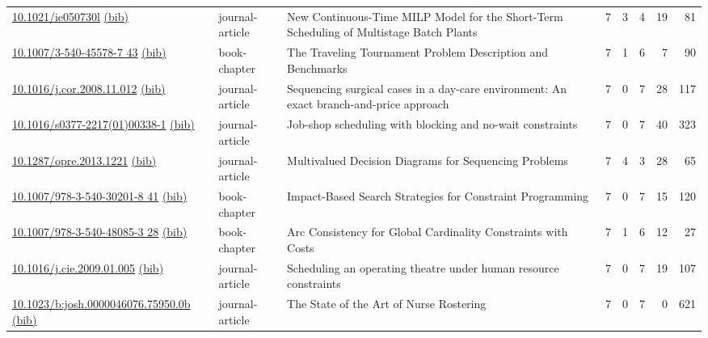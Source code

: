 {\begin{longtable}{p{5cm}lp{11cm}rrrrr}
\href{http://dx.doi.org/10.1021/ie050730l}{10.1021/ie050730l} \href{https://www.doi2bib.org/bib/10.1021/ie050730l}{(bib)} & journal-article & New Continuous-Time MILP Model for the Short-Term Scheduling of Multistage Batch Plants & 7 & 3 & 4 & 19 & 81 \\
\href{http://dx.doi.org/10.1007/3-540-45578-7_43}{10.1007/3-540-45578-7 43} \href{https://www.doi2bib.org/bib/10.1007/3-540-45578-7_43}{(bib)} & book-chapter & The Traveling Tournament Problem Description and Benchmarks & 7 & 1 & 6 & 7 & 90 \\
\href{http://dx.doi.org/10.1016/j.cor.2008.11.012}{10.1016/j.cor.2008.11.012} \href{https://www.doi2bib.org/bib/10.1016/j.cor.2008.11.012}{(bib)} & journal-article & Sequencing surgical cases in a day-care environment: An exact branch-and-price approach & 7 & 0 & 7 & 28 & 117 \\
\href{http://dx.doi.org/10.1016/s0377-2217(01)00338-1}{10.1016/s0377-2217(01)00338-1} \href{https://www.doi2bib.org/bib/10.1016/s0377-2217(01)00338-1}{(bib)} & journal-article & Job-shop scheduling with blocking and no-wait constraints & 7 & 0 & 7 & 40 & 323 \\
\href{http://dx.doi.org/10.1287/opre.2013.1221}{10.1287/opre.2013.1221} \href{https://www.doi2bib.org/bib/10.1287/opre.2013.1221}{(bib)} & journal-article & Multivalued Decision Diagrams for Sequencing Problems & 7 & 4 & 3 & 28 & 65 \\
\href{http://dx.doi.org/10.1007/978-3-540-30201-8_41}{10.1007/978-3-540-30201-8 41} \href{https://www.doi2bib.org/bib/10.1007/978-3-540-30201-8_41}{(bib)} & book-chapter & Impact-Based Search Strategies for Constraint Programming & 7 & 0 & 7 & 15 & 120 \\
\href{http://dx.doi.org/10.1007/978-3-540-48085-3_28}{10.1007/978-3-540-48085-3 28} \href{https://www.doi2bib.org/bib/10.1007/978-3-540-48085-3_28}{(bib)} & book-chapter & Arc Consistency for Global Cardinality Constraints with Costs & 7 & 1 & 6 & 12 & 27 \\
\href{http://dx.doi.org/10.1016/j.cie.2009.01.005}{10.1016/j.cie.2009.01.005} \href{https://www.doi2bib.org/bib/10.1016/j.cie.2009.01.005}{(bib)} & journal-article & Scheduling an operating theatre under human resource constraints & 7 & 0 & 7 & 19 & 107 \\
\href{http://dx.doi.org/10.1023/b:josh.0000046076.75950.0b}{10.1023/b:josh.0000046076.75950.0b} \href{https://www.doi2bib.org/bib/10.1023/b:josh.0000046076.75950.0b}{(bib)} & journal-article & The State of the Art of Nurse Rostering & 7 & 0 & 7 & 0 & 621 \\

\end{longtable}}
